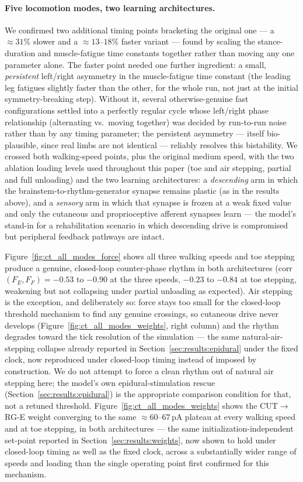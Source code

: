 \paragraph{Five locomotion modes, two learning architectures.} We confirmed
two additional timing points bracketing the original one --- a
$\approx31\%$ slower and a $\approx13$--$18\%$ faster variant --- found by
scaling the stance-duration and muscle-fatigue time constants together
rather than moving any one parameter alone. The faster point needed one
further ingredient: a small, \emph{persistent} left/right asymmetry in the
muscle-fatigue time constant (the leading leg fatigues slightly faster
than the other, for the whole run, not just at the initial symmetry-breaking
step). Without it, several otherwise-genuine fast configurations settled
into a perfectly regular cycle whose left/right phase relationship
(alternating vs.\ moving together) was decided by run-to-run noise rather
than by any timing parameter; the persistent asymmetry --- itself
bio-plausible, since real limbs are not identical --- reliably resolves
this bistability. We crossed both walking-speed points, plus the original
medium speed, with the two ablation loading levels used throughout this
paper (toe and air stepping, partial and full unloading) and the two
learning architectures: a \emph{descending} arm in which the
brainstem-to-rhythm-generator synapse remains plastic (as in the results
above), and a \emph{sensory} arm in which that synapse is frozen at a weak
fixed value and only the cutaneous and proprioceptive afferent synapses
learn --- the model's stand-in for a rehabilitation scenario in which
descending drive is compromised but peripheral feedback pathways are intact.

Figure~\ref{fig:ct_all_modes_force} shows all three walking speeds and toe
stepping produce a genuine, closed-loop counter-phase rhythm in both
architectures (corr$(F_E,F_F)=-0.53$ to $-0.90$ at the three speeds,
$-0.23$ to $-0.84$ at toe stepping, weakening but not collapsing under
partial unloading as expected). Air stepping is the exception, and
deliberately so: force stays too small for the closed-loop threshold
mechanism to find any genuine crossings, so cutaneous drive never
develops (Figure~\ref{fig:ct_all_modes_weights}, right column) and the
rhythm degrades toward the tick resolution of the simulation --- the
same natural-air-stepping collapse already reported in
Section~\ref{sec:results:epidural} under the fixed clock, now reproduced
under closed-loop timing instead of imposed by construction. We do not
attempt to force a clean rhythm out of natural air stepping here; the
model's own epidural-stimulation rescue (Section~\ref{sec:results:epidural})
is the appropriate comparison condition for that, not a retuned threshold.
Figure~\ref{fig:ct_all_modes_weights} shows the CUT$\to$RG-E weight
converging to the same $\approx60$--$67$\,pA plateau at every walking speed
and at toe stepping, in both architectures --- the same
initialization-independent set-point reported in
Section~\ref{sec:results:weights}, now shown to hold under closed-loop
timing as well as the fixed clock, across a substantially wider range of
speeds and loading than the single operating point first confirmed for
this mechanism.

